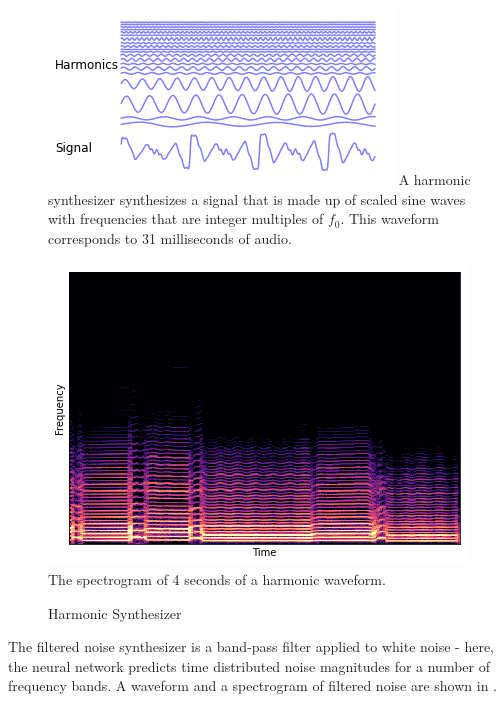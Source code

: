 \begin{figure}
    \centering
    \begin{minipage}[b]{0.45\textwidth}
        \includegraphics[width=\textwidth]{figures/harmonic_wave.png}
        \small A harmonic synthesizer synthesizes a signal that is made up of scaled sine waves with frequencies that are integer multiples of $f_0$. This waveform corresponds to 31 milliseconds of audio.
      \end{minipage}
      \hfill
      \begin{minipage}[b]{0.45\textwidth}
        \includegraphics[width=\textwidth]{figures/harmonic_spectro.png}
        \small The spectrogram of 4 seconds of a harmonic waveform.
    \end{minipage}
    \caption{Harmonic Synthesizer} 
    \label{fig:harmonic}   
\end{figure}

The filtered noise synthesizer is a band-pass filter applied to white noise - here, the neural network predicts time distributed noise magnitudes for a number of frequency bands. A waveform and a spectrogram of filtered noise are shown in . \newline

